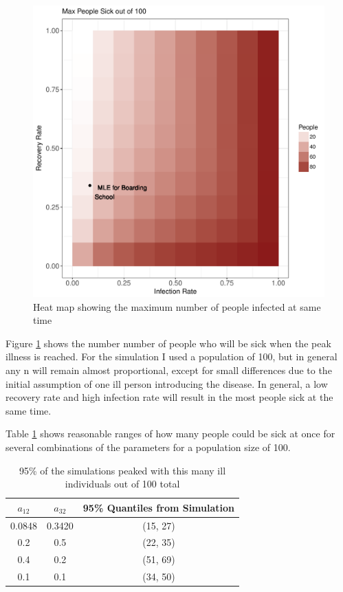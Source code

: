 \documentclass{svproc}
\begin{document}
\begin{figure}
\centering
\includegraphics[scale=.7]{MaxGrid.pdf}
\caption{Heat map showing the maximum number of people infected at same time}
\label{plot3}
\end{figure}

Figure \ref{plot3} shows the number number of people who will be sick when the peak illness is reached. For the simulation I used a population of 100, but in general any n will remain almost proportional, except for small differences due to the initial assumption of one ill person introducing the disease. In general, a low recovery rate and high infection rate will result in the most people sick at the same time.

Table \ref{tab3} shows reasonable ranges of how many people could be sick at once for several combinations of the parameters for a population size of 100. 
\begin{table}
\centering
\setlength{\tabcolsep}{5pt}
\begin{tabular}{|c|c|c|}

\hline
$a_{12}$ & $a_{32}$ & 95\% Quantiles from Simulation \\ \hline
0.0848 & 0.3420 & (15, 27) \\ \hline
0.2 & 0.5 & (22, 35) \\ \hline
0.4 & 0.2 & (51, 69) \\ \hline
0.1 & 0.1 & (34, 50) \\ \hline

\end{tabular}
\caption{95\% of the simulations peaked with this many ill individuals out of 100 total}
\label{tab3}
\end{table}
\end{document}

